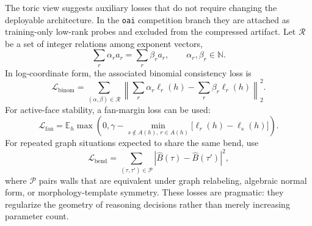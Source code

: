 \documentclass[11pt]{article}
\theoremstyle{definition}
\theoremstyle{plain}
\theoremstyle{remark}
\numberwithin{equation}{section}
\newcommand{\N}{\mathbb{N}}
\newcommand{\Eop}{\mathbb{E}}
\newcommand{\abs}[1]{\left\lvert #1\right\rvert}
\begin{document}
The toric view suggests auxiliary losses that do not require changing the deployable architecture.  In the \texttt{oai} competition branch they are attached as training-only low-rank probes and excluded from the compressed artifact.  Let $\mathcal R$ be a set of integer relations among exponent vectors,
\begin{equation}
  \sum_r \alpha_r a_r=\sum_r \beta_r a_r,
  \qquad \alpha_r,\beta_r\in\N.
\end{equation}
In log-coordinate form, the associated binomial consistency loss is
\begin{equation}
  \mathcal L_{\mathrm{binom}}
  =
  \sum_{(\alpha,\beta)\in\mathcal R}
  \left\|
    \sum_r\alpha_r \ell_r(h)-\sum_r\beta_r \ell_r(h)
  \right\|_2^2.
\end{equation}
For active-face stability, a fan-margin loss can be used:
\begin{equation}
  \mathcal L_{\mathrm{fan}}
  =
  \Eop_h\max\left(0,\gamma-
  \min_{s\notin A(h),\,r\in A(h)}
  \bigl[\ell_r(h)-\ell_s(h)\bigr]\right).
\end{equation}
For repeated graph situations expected to share the same bend, use
\begin{equation}
  \mathcal L_{\mathrm{bend}}
  =
  \sum_{(\tau,\tau')\in\mathcal P}
  \abs{\widehat B(\tau)-\widehat B(\tau')}^2,
\end{equation}
where $\mathcal P$ pairs walls that are equivalent under graph relabeling, algebraic normal form, or morphology-template symmetry.  These losses are pragmatic: they regularize the geometry of reasoning decisions rather than merely increasing parameter count.
\end{document}
